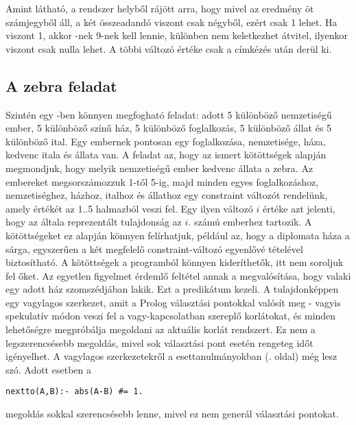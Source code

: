Amint látható, a rendszer helyből rájött arra, hogy mivel az eredmény öt
számjegyből áll, a két összeadandó viszont csak négyből, ezért 
csak 1 lehet. Ha viszont  1, akkor -nek 9-nek kell lennie,
különben nem keletkezhet átvitel, ilyenkor viszont  csak nulla lehet.
A többi változó értéke csak a címkézés után derül ki.

\subsection{A zebra feladat}
Szintén egy \Clpfd -ben könnyen megfogható feladat: adott 5 különböző
nemzetiségű ember, 5 különböző színű ház, 5 különböző foglalkozás, 5
különböző állat és 5 különböző ital. Egy embernek pontosan egy
foglalkozása, nemzetisége, háza, kedvenc itala és állata van. A
feladat az, hogy az ismert kötöttségek alapján megmondjuk, hogy melyik
nemzetiségű ember kedvenc állata a zebra. Az embereket megsorszámozzuk
1-től 5-ig, majd minden egyes foglalkozáshoz, nemzetiséghez, házhoz,
italhoz és állathoz egy constraint változót rendelünk, amely értékét
az 1..5 halmazból veszi fel. Egy ilyen változó $i$ értéke azt jelenti,
hogy az általa reprezentált tulajdonság az $i$. számú emberhez
tartozik. A kötöttségeket ez alapján könnyen felírhatjuk, például az,
hogy a diplomata háza a sárga, egyszerűen a két megfelelő
constraint-változó egyenlővé tételével biztosítható.  A kötöttségek a
programból könnyen kideríthetők, itt nem soroljuk fel őket. Az
egyetlen figyelmet érdemlő feltétel annak a megvalósítása, hogy
valaki egy adott ház szomszédjában lakik. Ezt a  predikátum
kezeli. A  tulajdonképpen egy vagylagos szerkezet, amit a
Prolog választási pontokkal valósít meg - vagyis spekulatív módon veszi fel a
vagy-kapcsolatban szereplő korlátokat, és minden lehetőségre
megpróbálja megoldani az aktuális korlát rendszert. Ez nem a legszerencsésebb
megoldás, mivel sok választási pont esetén rengeteg időt igényelhet. A
vagylagos szerkezetekről a \clpfd esettanulmányokban (\pageref{diszjunkcio}.
oldal) még lesz szó. Adott esetben a

\begin{verbatim}
nextto(A,B):- abs(A-B) #= 1.
\end{verbatim}

megoldás sokkal szerencsésebb lenne, mivel ez nem generál választási
pontokat.

